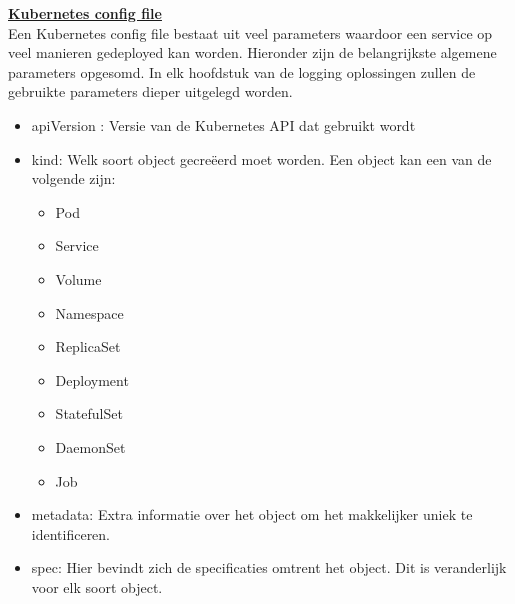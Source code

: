 \textbf{\underline{Kubernetes config file}}\\
Een Kubernetes config file bestaat uit veel parameters waardoor een service op veel manieren gedeployed kan worden. Hieronder zijn de belangrijkste algemene parameters opgesomd. In elk hoofdstuk van de logging oplossingen zullen de gebruikte parameters dieper uitgelegd worden.
\begin{itemize}
    \item apiVersion : Versie van de Kubernetes API dat gebruikt wordt
    \item kind: Welk soort object gecreëerd moet worden. Een object kan een van de volgende zijn: \begin{itemize}
        \item Pod
        \item Service
        \item Volume
        \item Namespace
        \item ReplicaSet
        \item Deployment
        \item StatefulSet
        \item DaemonSet
        \item Job
    \end{itemize}
    \item metadata: Extra informatie over het object om het makkelijker uniek te identificeren.
    \item spec: Hier bevindt zich de specificaties omtrent het object. Dit is veranderlijk voor elk soort object.
\end{itemize}

